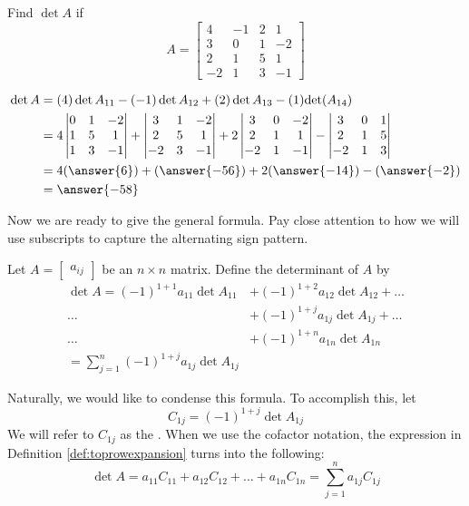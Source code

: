 \documentclass{ximera}
\begin{document}
\begin{example}\label{ex:expansiontoprow}
Find $\det{A}$ if 
$$A=\begin{bmatrix}4&-1&2&1\\3&0&1&-2\\
2&1&5&1\\-2&1&3&-1\end{bmatrix}$$
\begin{explanation}
\begin{align*}
\det{A}&=(4)\det{A_{11}}-(-1)\det{A_{12}}+(2)\det{A_{13}}-(1)\text{det}(A_{14})\\
&=4\begin{vmatrix}0&1&-2\\1&5&1\\1&3&-1\end{vmatrix}+\begin{vmatrix}3&1&-2\\2&5&1\\-2&3&-1\end{vmatrix}+2\begin{vmatrix}3&0&-2\\2&1&1\\-2&1&-1\end{vmatrix}-\begin{vmatrix}3&0&1\\2&1&5\\-2&1&3\end{vmatrix}\\&=4(\answer{6})+(\answer{-56})+2(\answer{-14})-(\answer{-2})\\
&=\answer{-58}
\end{align*}
\end{explanation}
\end{example}


Now we are ready to give the general formula. Pay close attention to how we will use subscripts to capture the alternating sign pattern.

\begin{definition}\label{def:toprowexpansion}  Let $A=\begin{bmatrix}a_{ij}\end{bmatrix}$ be an $n\times n$ matrix.  Define the determinant of $A$ by
\begin{align*}\det{A}=(-1)^{1+1}a_{11}\det{A_{11}}&+(-1)^{1+2}a_{12}\det{A_{12}}+\ldots \\
\ldots &+(-1)^{1+j}a_{1j}\det{A_{1j}}+\ldots \\
\ldots &+(-1)^{1+n}a_{1n}\det{A_{1n}}\\
=\sum_{j=1}^n(-1)^{1+j}a_{1j}\det{A_{1j}}
\end{align*}
\end{definition}
Naturally, we would like to condense this formula.  To accomplish this, let
$$C_{1j}=(-1)^{1+j}\det{A_{1j}}$$
We will refer to $C_{1j}$ as the .  When we use the cofactor notation, the expression in Definition \ref{def:toprowexpansion} turns into the following:
$$\det{A}=a_{11}C_{11}+a_{12}C_{12}+\ldots +a_{1n}C_{1n}=\sum_{j=1}^n a_{1j}C_{1j}$$
\end{document}
